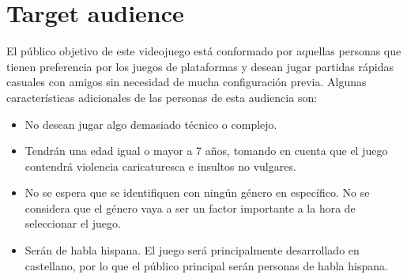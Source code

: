 \section{Target audience}%

El público objetivo de este videojuego está conformado por aquellas personas que
tienen preferencia por los juegos de plataformas y desean jugar partidas rápidas
casuales con amigos sin necesidad de mucha configuración previa. Algunas
características adicionales de las personas de esta audiencia son:

\begin{itemize}
    \item No desean jugar algo demasiado técnico o complejo.
    \item Tendrán una edad igual o mayor a 7 años, tomando en cuenta que el
    juego contendrá violencia caricaturesca e insultos no vulgares.
    \item No se espera que se identifiquen con ningún género en específico. No se considera que el género
    vaya a ser un factor importante a la hora de seleccionar el juego.
    \item Serán de habla hispana. El juego será principalmente desarrollado en
    castellano, por lo que el público principal serán personas de habla hispana.
\end{itemize}
